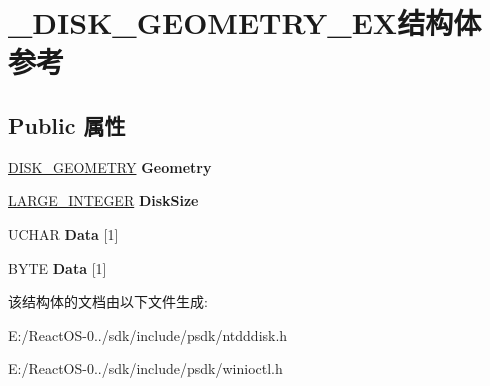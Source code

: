 \hypertarget{struct___d_i_s_k___g_e_o_m_e_t_r_y___e_x}{}\section{\+\_\+\+D\+I\+S\+K\+\_\+\+G\+E\+O\+M\+E\+T\+R\+Y\+\_\+\+E\+X结构体 参考}
\label{struct___d_i_s_k___g_e_o_m_e_t_r_y___e_x}
\subsection*{Public 属性}
\begin{DoxyCompactItemize}
\item 
\mbox{\label{struct___d_i_s_k___g_e_o_m_e_t_r_y___e_x_a0697ce803f6bf06d451a28d0075a6911}} 
\hyperlink{struct___d_i_s_k___g_e_o_m_e_t_r_y}{D\+I\+S\+K\+\_\+\+G\+E\+O\+M\+E\+T\+RY} {\bfseries Geometry}
\item 
\mbox{\label{struct___d_i_s_k___g_e_o_m_e_t_r_y___e_x_ad31a113db82881a5f777ad0775bf10de}} 
\hyperlink{union___l_a_r_g_e___i_n_t_e_g_e_r}{L\+A\+R\+G\+E\+\_\+\+I\+N\+T\+E\+G\+ER} {\bfseries Disk\+Size}
\item 
\mbox{\label{struct___d_i_s_k___g_e_o_m_e_t_r_y___e_x_ae3709ffe29a262140805f53178854fa0}} 
U\+C\+H\+AR {\bfseries Data} \mbox{[}1\mbox{]}
\item 
\mbox{\label{struct___d_i_s_k___g_e_o_m_e_t_r_y___e_x_a12cb8a9eca36d383fd29079cd195b67d}} 
B\+Y\+TE {\bfseries Data} \mbox{[}1\mbox{]}
\end{DoxyCompactItemize}


该结构体的文档由以下文件生成\+:\begin{DoxyCompactItemize}
\item 
E\+:/\+React\+O\+S-\/0../sdk/include/psdk/ntdddisk.\+h\item 
E\+:/\+React\+O\+S-\/0../sdk/include/psdk/winioctl.\+h\end{DoxyCompactItemize}
